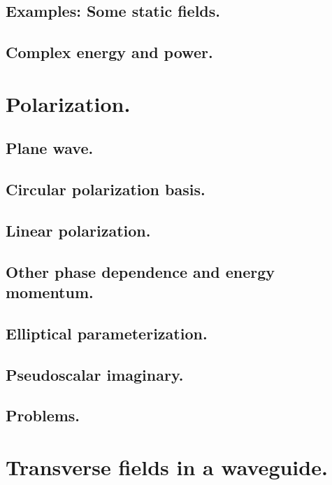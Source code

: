          \subsection{Examples: Some static fields.}
            
         \subsection{Complex energy and power.}
            
      \section{Polarization.}
         \subsection{Plane wave.}
            
         \subsection{Circular polarization basis.}
            
         \subsection{Linear polarization.}
            
         \subsection{Other phase dependence and energy momentum.}
            
         \subsection{Elliptical parameterization.}
            
         \subsection{Pseudoscalar imaginary.}
            
         \subsection{Problems.}
            
      \section{Transverse fields in a waveguide.}
         
